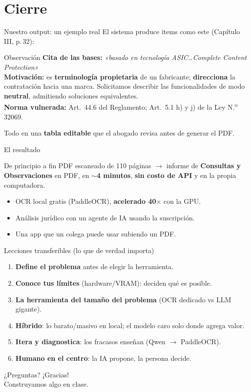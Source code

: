\documentclass[10pt,aspectratio=169]{beamer}
\begin{document}
\section{Cierre}

\begin{frame}{Nuestro output: un ejemplo real}
  El sistema produce items como este (Capítulo III, p.\,32):
  \begin{exampleblock}{Observación}
    \footnotesize
    \textbf{Cita de las bases:} \emph{«basado en tecnología ASIC\ldots Complete Content Protection»}\\[3pt]
    \textbf{Motivación:} es \textbf{terminología propietaria} de un fabricante; \textbf{direcciona} la contratación hacia una marca. Solicitamos describir las funcionalidades de modo \textbf{neutral}, admitiendo soluciones equivalentes.\\[3pt]
    \textbf{Norma vulnerada:} Art.~44.6 del Reglamento; Art.~5.1 h) y j) de la Ley N.\textsuperscript{o} 32069.
  \end{exampleblock}
  \centering\footnotesize Todo en una \textbf{tabla editable} que el abogado revisa antes de generar el PDF.
\end{frame}

\begin{frame}{El resultado}
  \begin{block}{De principio a fin}
    PDF escaneado de 110 páginas \;$\rightarrow$\; informe de \textbf{Consultas y Observaciones} en PDF, en \textbf{$\sim$4 minutos}, \textbf{sin costo de API} y en la propia computadora.
  \end{block}
  \vfill
  \begin{itemize}
    \item OCR local gratis (PaddleOCR), \textbf{acelerado 40$\times$} con la GPU.
    \item Análisis jurídico con un agente de IA usando la suscripción.
    \item Una app que un colega puede usar subiendo un PDF.
  \end{itemize}
\end{frame}

\begin{frame}{Lecciones transferibles (lo que de verdad importa)}
  \begin{enumerate}
    \item \textbf{Define el problema} antes de elegir la herramienta.
    \item \textbf{Conoce tus límites} (hardware/VRAM): deciden qué es posible.
    \item \textbf{La herramienta del tamaño del problema} (OCR dedicado vs LLM gigante).
    \item \textbf{Híbrido}: lo barato/masivo en local; el modelo caro solo donde agrega valor.
    \item \textbf{Itera y diagnostica}: los fracasos enseñan (Qwen $\rightarrow$ PaddleOCR).
    \item \textbf{Humano en el centro}: la IA propone, la persona decide.
  \end{enumerate}
\end{frame}

\begin{frame}{¿Preguntas?}
  \vfill
  \centering
  {\Huge ¡Gracias!}\\[12pt]
  {\large Construyamos algo en clase.}
  \vfill
\end{frame}
\end{document}
